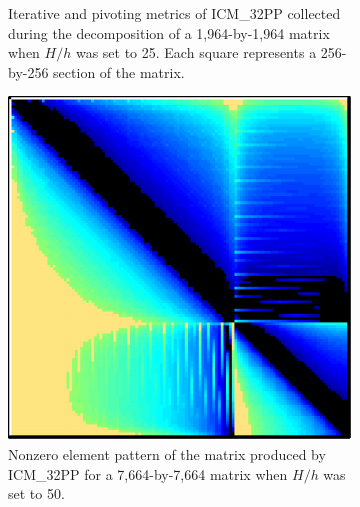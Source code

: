 \begin{figure}[ht!]
\begin{subfigure}[t]{0.51\textwidth}
		\caption{Iterative and pivoting metrics of ICM\_32PP collected during the decomposition of a 1,964-by-1,964 matrix when $H/h$ was set to 25.
			Each square represents a 256-by-256 section of the matrix.
		}
		\label{Figure:comparing-decomposers-and-solvers->bddcml-benchmark->benchmark-results->speedup-comparison-of-decomposers-in-pc-setup-stage->speedup-comparison->ICM_32PP->25-4-2->metrics}
	\end{subfigure}
	
	\begin{subfigure}[t]{0.45\textwidth}
		\centering
		\includegraphics[width=\textwidth]{images/ch03/input-matrices/bddcml-benchmark/poc-50_4_2-LU_ICM32PP.pdf}
		\caption{Nonzero element pattern of the  matrix produced by ICM\_32PP for a 7,664-by-7,664 matrix when $H/h$ was set to 50.}
		\label{Figure:comparing-decomposers-and-solvers->bddcml-benchmark->benchmark-results->speedup-comparison-of-decomposers-in-pc-setup-stage->speedup-comparison->ICM_32PP->50-4-2->LU}
	\end{subfigure}%
	\hspace{0.03\textwidth}
	\begin{subfigure}[t]{0.51\textwidth}
		\centering

\end{subfigure}
\end{figure}
